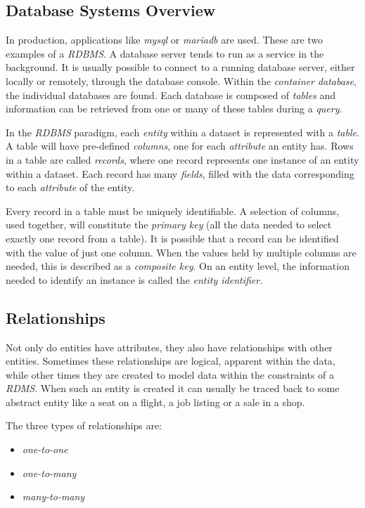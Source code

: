 \documentclass[10pt]{article}
\begin{document}
\subsection{Database Systems Overview}
\label{sec:org2c830ca}

In production, applications like \emph{mysql} or \emph{mariadb} are used. These are two examples of a \emph{RDBMS}. A database server tends to run as a service in the background. It is usually possible to connect to a running database server, either locally or remotely, through the database console. Within the \emph{container database}, the individual databases are found. Each database is composed of \emph{tables} and information can be retrieved from one or many of these tables during a \emph{query}.

In the \emph{RDBMS} paradigm, each \emph{entity} within a dataset is represented with a \emph{table}. A table will have pre-defined \emph{columns}, one for each \emph{attribute} an entity has. Rows in a table are called \emph{records}, where one record represents one instance of an entity within a dataset. Each record has many \emph{fields}, filled with the data corresponding to each \emph{attribute} of the entity.

Every record in a table must be uniquely identifiable. A selection of columns, used together, will constitute the \emph{primary key} (all the data needed to select exactly one record from a table). It is possible that a record can be identified with the value of just one column. When the values held by multiple columns are needed, this is described as a \emph{composite key}. On an entity level, the information needed to identify an instance is called the \emph{entity identifier.}

\subsection{Relationships}
\label{sec:org58a25dc}

Not only do entities have attributes, they also have relationships with other entities. Sometimes these relationships are logical, apparent within the data, while other times they are created to model data within the constraints of a \emph{RDMS}. When such an entity is created it can usually be traced back to some abstract entity like a seat on a flight, a job listing or a sale in a shop.

The three types of relationships are:

\begin{itemize}
\item \emph{one-to-one}
\item \emph{one-to-many}
\item \emph{many-to-many}
\end{itemize}
\end{document}
